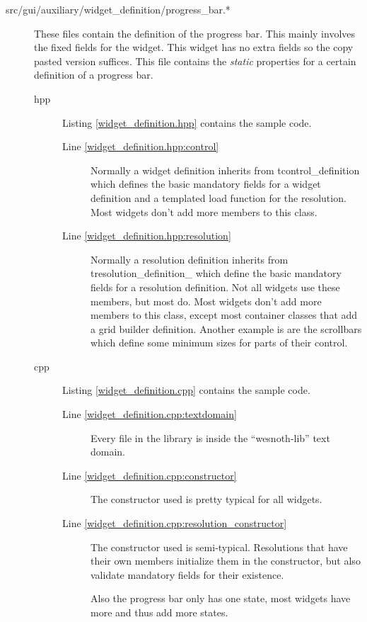 \documentclass[a4paper,notitlepage]{report}
\begin{document}
\begin{description}

\item[src/gui/auxiliary/widget\_definition/progress\_bar.*]
	These files contain the definition of the progress bar. This mainly involves
	the fixed fields for the widget. This widget has no extra fields so the copy
	pasted version suffices. This file contains the \emph{static} properties for
	a certain definition of a progress bar.

\begin{description}
\item[hpp] Listing \ref{widget_definition.hpp} contains the sample code. 
	\begin{description}
	\item[Line \ref{widget_definition.hpp:control}] Normally a
		widget definition inherits from tcontrol\_definition which defines the
		basic mandatory fields for a widget definition and a templated load
		function for the resolution. Most widgets don't add more members to this
		class.
	\item[Line \ref{widget_definition.hpp:resolution}] Normally a resolution
		definition inherits from tresolution\_definition\_ which define the
		basic mandatory fields for a resolution definition. Not all widgets use
		these members, but most do. Most widgets don't add more members to this
		class, except most container classes that add a grid builder
		definition. Another example is are the scrollbars which define some
		minimum sizes for parts of their control.
	\end{description}

\item[cpp] Listing \ref{widget_definition.cpp} contains the sample code. 
	\begin{description}
	\item[Line \ref{widget_definition.cpp:textdomain}] Every file in the library
		is inside the ``wesnoth-lib'' text domain.
	\item[Line \ref{widget_definition.cpp:constructor}] The constructor used is
		pretty typical for all widgets.
	\item[Line \ref{widget_definition.cpp:resolution_constructor}] The
		constructor used is semi-typical. Resolutions that have their own
		members initialize them in the constructor, but also validate mandatory
		fields for their existence.

		Also the progress bar only has one state, most widgets have more and
		thus add more states.


\end{description}
\end{description}
\end{description}
\end{document}
